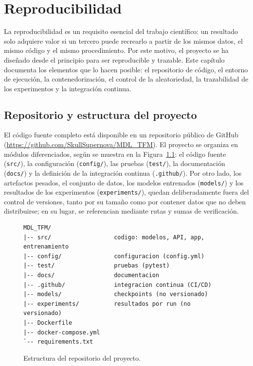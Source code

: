 %
\chapter{Reproducibilidad}
\label{sec::capitulo7}

La reproducibilidad es un requisito esencial del trabajo científico: un resultado solo
adquiere valor si un tercero puede recrearlo a partir de los mismos datos, el mismo
código y el mismo procedimiento. Por este motivo, el proyecto se ha diseñado desde el
principio para ser reproducible y trazable. Este capítulo documenta los elementos que
lo hacen posible: el repositorio de código, el entorno de ejecución, la
contenedorización, el control de la aleatoriedad, la trazabilidad de los experimentos
y la integración continua.

\section{Repositorio y estructura del proyecto}
\label{sec::repro_repo}

El código fuente completo está disponible en un repositorio público de GitHub
(\url{https://github.com/SkullSupernova/MDL_TFM}). El proyecto se organiza en módulos
diferenciados, según se muestra en la Figura~\ref{fig::repro_estructura}: el código
fuente (\texttt{src/}), la configuración (\texttt{config/}), las pruebas
(\texttt{test/}), la documentación (\texttt{docs/}) y la definición de la integración
continua (\texttt{.github/}). Por otro lado, los artefactos pesados, el conjunto de
datos, los modelos entrenados (\texttt{models/}) y los resultados de los experimentos
(\texttt{experiments/}), quedan deliberadamente fuera del control de versiones, tanto
por su tamaño como por contener datos que no deben distribuirse; en su lugar, se
referencian mediante rutas y sumas de verificación.

\begin{figure}[ht]
\centering
\begin{minipage}{0.82\textwidth}
\begin{verbatim}
MDL_TFM/
|-- src/                  codigo: modelos, API, app, entrenamiento
|-- config/               configuracion (config.yml)
|-- test/                 pruebas (pytest)
|-- docs/                 documentacion
|-- .github/              integracion continua (CI/CD)
|-- models/               checkpoints (no versionado)
|-- experiments/          resultados por run (no versionado)
|-- Dockerfile
|-- docker-compose.yml
`-- requirements.txt
\end{verbatim}
\end{minipage}
\caption{Estructura del repositorio del proyecto.}
\label{fig::repro_estructura}
\end{figure}

